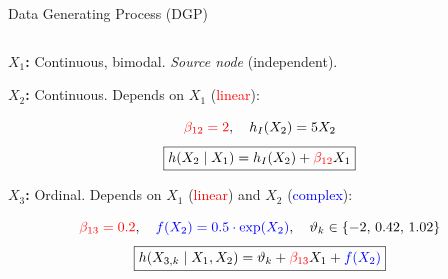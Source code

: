 \documentclass[onlytextwidth,english]{beamer}\usepackage[]{graphicx}\usepackage[]{xcolor}
\begin{document}
\begin{frame}{Data Generating Process (DGP)}

\begin{columns}

\begin{column}{0.72\textwidth}

\textbf{\(X_1\):} Continuous, bimodal. \textit{Source node} (independent).

\vspace{0.4cm}

\textbf{\(X_2\):} Continuous. Depends on \(X_1\) (\textcolor{red}{linear}):

\vspace{0.15cm}
{\scriptsize
\[
\textcolor{red}{\beta_{12} = 2}, \quad h_I(X_2) = 5 X_2
\]
\[
\boxed{
h(X_2 \mid X_1) = h_I(X_2) + \textcolor{red}{\beta_{12}} X_1
}
\]
}

\vspace{0.4cm}

\textbf{\(X_3\):} Ordinal. Depends on \(X_1\) (\textcolor{red}{linear}) and \(X_2\) (\textcolor{blue}{complex}):

\vspace{0.15cm}
{\scriptsize
\[
\textcolor{red}{\beta_{13} = 0.2}, \quad \textcolor{blue}{f(X_2) = 0.5 \cdot \exp(X_2)}, \quad \vartheta_k \in \{-2,\, 0.42,\, 1.02\}
\]
\[
\boxed{
h(X_{3,k} \mid X_1, X_2) = \vartheta_k + \textcolor{red}{\beta_{13}} X_1 + \textcolor{blue}{f(X_2)}
}
\]
}

\end{column}


\end{columns}
\end{frame}
\end{document}
